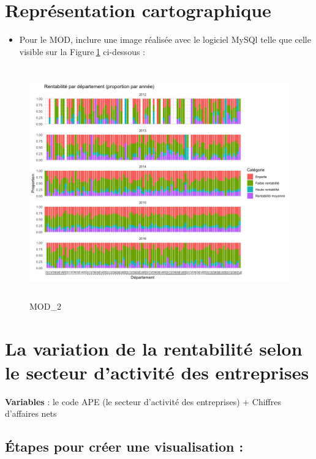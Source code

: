 \documentclass[mstat,12pt]{unswthesis}
\begin{document}
\newpage

\section*{Représentation cartographique}

\begin{itemize}
\tightlist
\item
  Pour le MOD, inclure une image réalisée avec le logiciel MySQl
  \newline telle que celle visible sur la Figure\(~\)\ref{box_plot}
  ci-dessous :
\end{itemize}

\begin{figure}
\centering
\includegraphics[width=15cm,height=10cm]{box_plot_par_anne.png}
\caption{MOD\_2}\label{box_plot}
\end{figure}

\newpage

\section{\texorpdfstring{\textbf{La variation de la rentabilité selon le
secteur d'activité des
entreprises}}{La variation de la rentabilité selon le secteur d'activité des entreprises}}\label{la-variation-de-la-rentabilituxe9-selon-le-secteur-dactivituxe9-des-entreprises}

\bigskip

\textbf{Variables} : le code APE (le secteur d'activité des entreprises)
+ Chiffres d'affaires nets

\subsection{Étapes pour créer une visualisation
:}\label{uxe9tapes-pour-cruxe9er-une-visualisation-2}
\end{document}
